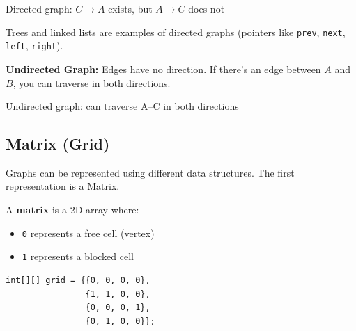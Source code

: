 \begin{center}

{\small Directed graph: $C \to A$ exists, but $A \to C$ does not}
\end{center}

Trees and linked lists are examples of directed graphs (pointers like \texttt{prev}, \texttt{next}, \texttt{left}, \texttt{right}).

\textbf{Undirected Graph:}
Edges have no direction. If there's an edge between $A$ and $B$, you can traverse in both directions.

\begin{center}

{\small Undirected graph: can traverse A--C in both directions}
\end{center}

\subsection{Matrix (Grid)}

Graphs can be represented using different data structures. The first representation is a Matrix.

A \textbf{matrix} is a 2D array where:
\begin{itemize}
  \item \texttt{0} represents a free cell (vertex)
  \item \texttt{1} represents a blocked cell
\end{itemize}

\begin{verbatim}
int[][] grid = {{0, 0, 0, 0},
                {1, 1, 0, 0},
                {0, 0, 0, 1},
                {0, 1, 0, 0}};
\end{verbatim}

